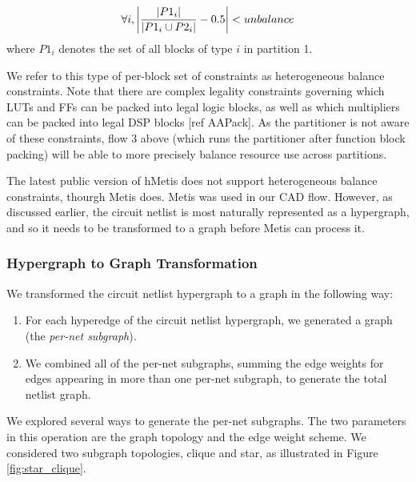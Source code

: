 \begin{equation}
\forall i, \abs*{ \frac{| P1_i |}{|P1_i \cup P2_i |} - 0.5} < unbalance
\end{equation}
where $P1_i$ denotes the set of all blocks of type $i$ in partition 1.

We refer to this type of per-block set of constraints as heterogeneous balance constraints. Note that there are complex legality constraints governing which LUTs and FFs can be packed into legal logic blocks, as well as which multipliers can be packed into legal DSP blocks [ref AAPack]. As the partitioner is not aware of these constraints, flow 3 above (which runs the partitioner after function block packing) will be able to more precisely balance resource use across partitions.

The latest public version of hMetis does not support heterogeneous balance constraints, thourgh Metis does. Metis was used in our CAD flow. However, as discussed earlier, the circuit netlist is most naturally represented as a hypergraph, and so it needs to be transformed to a graph before Metis can process it.

\subsubsection{Hypergraph to Graph Transformation}
We transformed the circuit netlist hypergraph to a graph in the following way:
\begin{enumerate}
\item For each hyperedge of the circuit netlist hypergraph, we generated a graph (the \emph{per-net subgraph}).
\item We combined all of the per-net subgraphs, summing the edge weights for edges appearing in more than one per-net subgraph, to generate the total netlist graph.
\end{enumerate}

We explored several ways to generate the per-net subgraphs. The two parameters in this operation are the graph topology and the edge weight scheme. We considered two subgraph topologies, clique and star, as illustrated in Figure \ref{fig:star_clique}.

